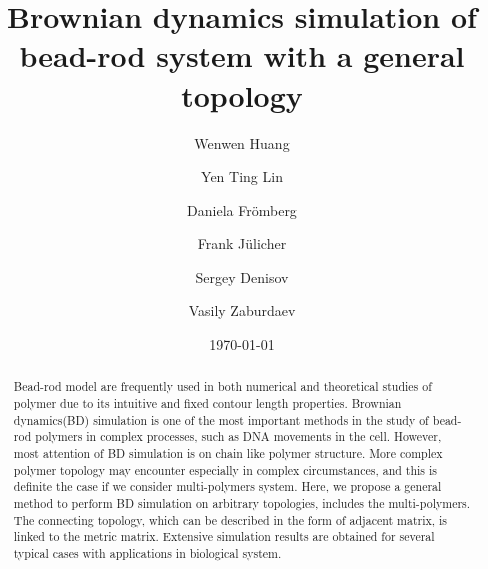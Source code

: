 \documentclass[preprint,aps,draft]{revtex4}
\begin{document}
\title{Brownian dynamics simulation of bead-rod system with a general topology}

\author{Wenwen Huang}
\author{Yen Ting Lin}
\author{Daniela Fr\"{o}mberg}
\author{Frank J\"{u}licher}
\author{Sergey Denisov}
\author{Vasily Zaburdaev}
\date{\today}

\begin{abstract}

Bead-rod model are frequently used in both numerical and theoretical studies of polymer due to its intuitive and fixed contour length properties.
Brownian dynamics(BD) simulation is one of the most important methods in the study of bead-rod polymers in complex processes, such as DNA movements in the cell. 
However, most attention of BD simulation is on chain like polymer structure.
More complex polymer topology may encounter especially in complex circumstances, and this is definite the case if we consider multi-polymers system.
Here, we propose a general method to perform BD simulation on arbitrary topologies, includes the multi-polymers.
The connecting topology, which can be described in the form of adjacent matrix, is linked to the metric matrix.
Extensive simulation results are obtained for several typical cases with applications in biological system.

\end{abstract}
\maketitle
\end{document}
